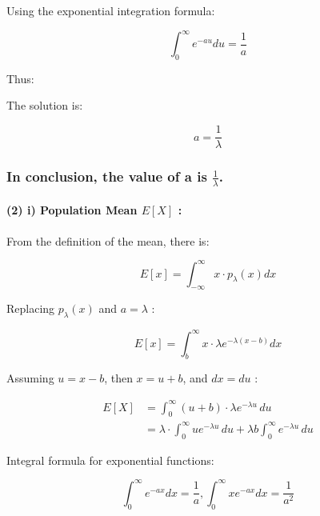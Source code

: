 \documentclass[
]{article}
\begin{document}
Using the exponential integration formula:

\[
\begin{equation}
\int_{0}^{\infty} e^{-a u} d u=\frac{1}{a} \tag{7}
\end{equation}
\]

Thus:

The solution is:

\[
\begin{equation}
a=\frac{1}{\lambda} \tag{9}
\end{equation}
\]

\subsubsection{\texorpdfstring{In conclusion, the value of a is
\(\frac{1}{\lambda}\).}{In conclusion, the value of a is \textbackslash frac\{1\}\{\textbackslash lambda\}.}}\label{in-conclusion-the-value-of-a-is-frac1lambda.}

\paragraph{\texorpdfstring{(2) i) Population Mean \(E[X]\)
:}{(2) i) Population Mean E{[}X{]} :}}\label{i-population-mean-ex}

From the definition of the mean, there is:

\[
\begin{equation}
E[x]=\int_{-\infty}^{\infty} x \cdot p_{\lambda}(x) d x \tag{1}
\end{equation}
\]

Replacing \(p_{\lambda}(x)\) and \(a=\lambda\) :

\[
\begin{equation}
E[x]=\int_{b}^{\infty} x \cdot \lambda e^{-\lambda(x-b)} d x \tag{2}
\end{equation}
\]

Assuming \(u=x-b\), then \(x=u+b\), and \(d x=d u\) :

\[
\begin{align*}
E[X] &= \int_{0}^{\infty}(u + b) \cdot \lambda e^{-\lambda u} \, du \\
     &= \lambda \cdot \int_{0}^{\infty} u e^{-\lambda u} \, du + \lambda b \int_{0}^{\infty} e^{-\lambda u} \, du \tag{3}
\end{align*}
\]

Integral formula for exponential functions:

\[
\begin{equation}
\int_{0}^{\infty} e^{-a x} d x=\frac{1}{a}, \int_{0}^{\infty} x e^{-a x} d x=\frac{1}{a^{2}} \tag{4}
\end{equation}
\]
\end{document}
